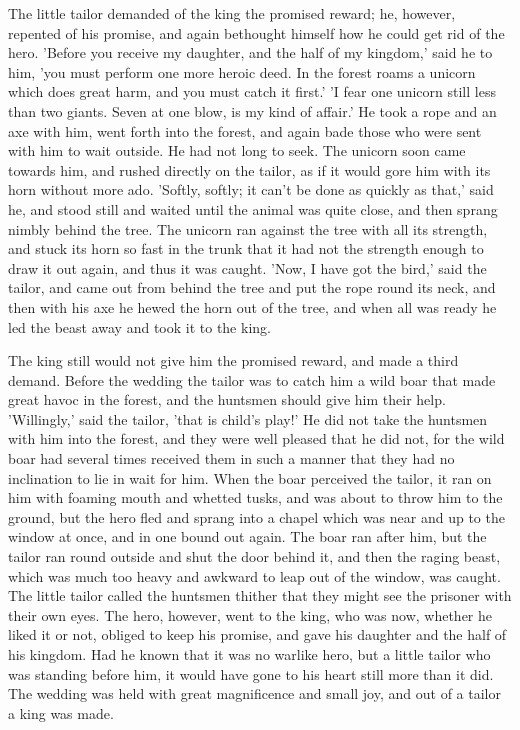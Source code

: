 \documentclass[12pt]{book}
\begin{document}
The little tailor demanded of the king the promised reward; he,
however, repented of his promise, and again bethought himself how he
could get rid of the hero. 'Before you receive my daughter, and the
half of my kingdom,' said he to him, 'you must perform one more heroic
deed. In the forest roams a unicorn which does great harm, and you
must catch it first.' 'I fear one unicorn still less than two giants.
Seven at one blow, is my kind of affair.' He took a rope and an axe
with him, went forth into the forest, and again bade those who were
sent with him to wait outside. He had not long to seek. The unicorn
soon came towards him, and rushed directly on the tailor, as if it
would gore him with its horn without more ado. 'Softly, softly; it
can't be done as quickly as that,' said he, and stood still and waited
until the animal was quite close, and then sprang nimbly behind the
tree. The unicorn ran against the tree with all its strength, and
stuck its horn so fast in the trunk that it had not the strength
enough to draw it out again, and thus it was caught. 'Now, I have got
the bird,' said the tailor, and came out from behind the tree and put
the rope round its neck, and then with his axe he hewed the horn out
of the tree, and when all was ready he led the beast away and took it
to the king.

The king still would not give him the promised reward, and made a
third demand. Before the wedding the tailor was to catch him a wild
boar that made great havoc in the forest, and the huntsmen should give
him their help. 'Willingly,' said the tailor, 'that is child's play!'
He did not take the huntsmen with him into the forest, and they were
well pleased that he did not, for the wild boar had several times
received them in such a manner that they had no inclination to lie in
wait for him. When the boar perceived the tailor, it ran on him with
foaming mouth and whetted tusks, and was about to throw him to the
ground, but the hero fled and sprang into a chapel which was near and
up to the window at once, and in one bound out again. The boar ran
after him, but the tailor ran round outside and shut the door behind
it, and then the raging beast, which was much too heavy and awkward to
leap out of the window, was caught. The little tailor called the
huntsmen thither that they might see the prisoner with their own eyes.
The hero, however, went to the king, who was now, whether he liked it
or not, obliged to keep his promise, and gave his daughter and the
half of his kingdom. Had he known that it was no warlike hero, but a
little tailor who was standing before him, it would have gone to his
heart still more than it did. The wedding was held with great
magnificence and small joy, and out of a tailor a king was made.
\end{document}
